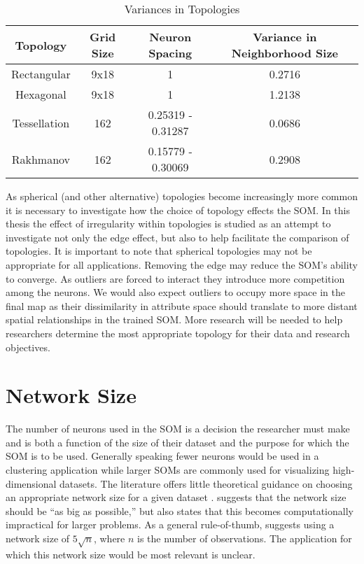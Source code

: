 \begin{table}[htbp]
\caption{Variances in Topologies}
\begin{center}
\begin{tabular}{|c|c|c|c|}
\hline
Topology&Grid Size&Neuron Spacing&Variance in Neighborhood Size\\
\hline
Rectangular&9x18&1&0.2716\\
Hexagonal&9x18&1&1.2138\\
Tessellation&162&0.25319 - 0.31287& 0.0686\\
Rakhmanov&162&0.15779 - 0.30069& 0.2908\\
\hline
\end{tabular}
\end{center}
\label{table1}
\end{table}

As spherical (and other alternative) topologies become
increasingly more common it is necessary to investigate how the choice of
topology effects the SOM.  In this thesis the effect of irregularity within
topologies is studied as an attempt to investigate not only the edge effect,
but also to help facilitate the comparison of topologies.  It is important to
note that spherical topologies may not be appropriate for all applications.
Removing the edge may reduce the SOM's ability to converge.  As outliers are
forced to interact they introduce more competition among the neurons.  We
would also expect outliers to occupy more space in the final map as their
dissimilarity in attribute space should translate to more distant spatial
relationships in the trained SOM.  More research will be needed to help
researchers determine the most appropriate topology for their data and research objectives.

\section{Network Size}
\label{bg:size}
The number of neurons used in the SOM is a decision the researcher must make and
is both a function of the size of their dataset and the purpose for which the
SOM is to be used.  Generally speaking fewer neurons would be used in a
clustering application while larger SOMs are commonly used for visualizing
high-dimensional datasets.  The literature offers little theoretical guidance
on choosing an appropriate network size for a given dataset \citep{cho1996}.
\cite{toolbox} suggests that the network size should be ``as big as
possible,'' but also states that this becomes computationally impractical for
larger problems. As a general rule-of-thumb, \citeauthor{toolbox} suggests using a
network size of \(5\sqrt {n}\), where \(n\) is the number of observations. The
application for which this network size would be most relevant is unclear.  

